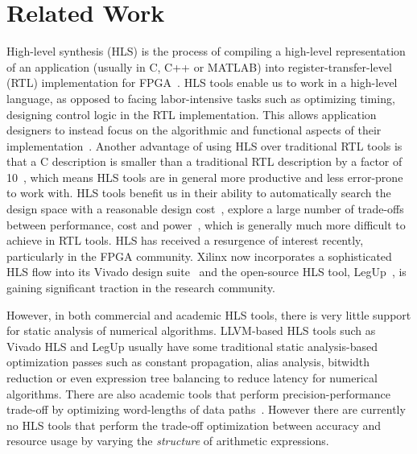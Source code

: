 \section{Related Work}
\label{sec:related_work}

High-level synthesis (HLS) is the process of compiling a high-level
representation of an application (usually in C, C++ or MATLAB) into
register-transfer-level (RTL) implementation for FPGA~\cite{coussy, gajski}.
HLS tools enable us to work in a high-level language, as opposed to facing
labor-intensive tasks such as optimizing timing, designing control logic in
the RTL implementation. This allows application designers to instead focus on
the algorithmic and functional aspects of their implementation~\cite{coussy}.
Another advantage of using HLS over traditional RTL tools is that a C
description is smaller than a traditional RTL description by a factor
of 10~\cite{coussy, bdti}, which means HLS tools are in general more
productive and less error-prone to work with. HLS tools benefit us in their
ability to automatically search the design space with a reasonable design
cost~\cite{bdti}, explore a large number of trade-offs between performance,
cost and power~\cite{mcfarland}, which is generally much more difficult to
achieve in RTL tools. HLS has received a resurgence of interest recently,
particularly in the FPGA community. Xilinx now incorporates a sophisticated
HLS flow into its Vivado design suite~\cite{vivado_hls} and the open-source
HLS tool, LegUp~\cite{legup}, is gaining significant traction in the research
community.

However, in both commercial and academic HLS tools, there is very little
support for static analysis of numerical algorithms. LLVM-based HLS
tools such as Vivado HLS and LegUp usually have some traditional static
analysis-based optimization passes such as constant propagation, alias
analysis, bitwidth reduction or even expression tree balancing to reduce
latency for numerical algorithms. There are also academic tools that
perform precision-performance trade-off by optimizing word-lengths of data
paths~\cite{constantinides}. However there are currently no HLS tools that
perform the trade-off optimization between accuracy and resource usage by
varying the \emph{structure} of arithmetic expressions.

